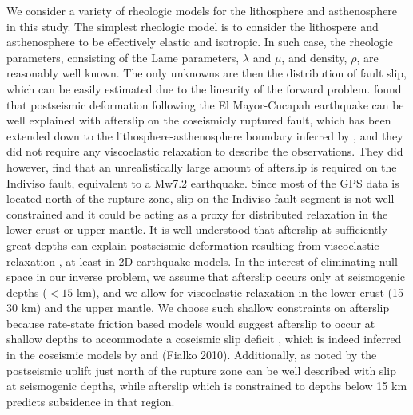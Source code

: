 \documentclass[12pt]{article}
\begin{document}
We consider a variety of rheologic models for the lithosphere and asthenosphere in this study.  The simplest rheologic model is to consider the lithospere and asthenosphere to be effectively elastic and isotropic.  In such case, the rheologic parameters, consisting of the Lame parameters, $\lambda$ and $\mu$, and density, $\rho$, are reasonably well known. The only unknowns are then the distribution of fault slip, which can be easily estimated due to the linearity of the forward problem.  \cite{Rollins2015} found that postseismic deformation following the El Mayor-Cucapah earthquake can be well explained with afterslip on the coseismicly ruptured fault, which has been extended down to the lithosphere-asthenosphere boundary inferred by \cite{Lekic2011}, and they did not require any viscoelastic relaxation to describe the observations.  They did however, find that an unrealistically large amount of afterslip is required on the Indiviso fault, equivalent to a Mw7.2 earthquake.  Since most of the GPS data is located north of the rupture zone, slip on the Indiviso fault segment is not well constrained and it could be acting as a proxy for distributed relaxation in the lower crust or upper mantle.  It is well understood that afterslip at sufficiently great depths can explain postseismic deformation resulting from viscoelastic relaxation \cite{Savage1990}, at least in 2D earthquake models.  In the interest of eliminating null space in our inverse problem,  we assume that afterslip occurs only at seismogenic depths ($<15$ km), and we allow for viscoelastic relaxation in the lower crust (15-30 km) and the upper mantle.  We choose such shallow constraints on afterslip because rate-state friction based models would suggest afterslip to occur at shallow depths to accommodate a coseismic slip deficit \cite{Marone1991}, which is indeed inferred in the coseismic models by \cite{Wei2011a} and (Fialko 2010).  Additionally, as noted by \cite{Rollins2015} the postseismic uplift just north of the rupture zone can be well described with slip at seismogenic depths, while afterslip which is constrained to depths below 15 km predicts subsidence in that region.  
\end{document}
